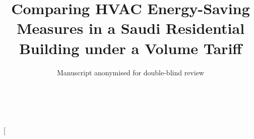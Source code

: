 \documentclass[10pt,a4paper,twocolumn]{article}
\title{\bfseries Comparing HVAC Energy-Saving Measures in a Saudi Residential Building under a Volume Tariff}
\author{Manuscript anonymised for double-blind review \\[6pt]
\mbox{}\\ \mbox{}\\[4pt]
\mbox{}}
\date{}
\author{ }
\theoremstyle{definition}
\begin{document}
\nocite{stockmodel2020,passive_saudi2025,retrofit_jeddah2023,braun1990,naderi2022precool,mayes2024precool,sec_tariff,rl2026hvac,ledreau2016flex,reynders2018flex,mousa2016optimal,mousa2017optimal,henzinger_2000,alur2012optimal,wojtczak2013optimal,alur2013safe,nghiem2011green,nghiem2012scalable,drgona2020mpc,kim2022mpcreview,hou2022mpc,dhaliwal2026mpc,zheng2024empc,wang2024mldr,turner2015peak,wang2023precool,braun2003load,morgan2007impact,canet2023flex,arababadi2017precool,ramacuriel2022dlc,oldewurtel2010reducing,matar2017tou,alayed2021thermal,alsanea_insulation2022,alyami2021building,sbc_envelope2021,alhomoud2021review,krarti_peak2022,alaidroos2015envelope,krarti2020ac,almogbel2020inverter,aldubyan_stayhome2022,alshahrani2019smart,hoyt2015setpoint,standard55,ISO7730,tarsheed_setpoint,sbc201_2018,saso2663_2014,saso2663,sbc602_2018,iso13370_2017,iso13790_2008,brown1962natural,ashrae_fund2021,ahri210240,se_tariff2027,crawley2001energyplus,schork2020ipx,huangfu2018highs,goulart2026clarabel,helton2003lhs,marino2008prcc,tian2013review,saltelli2010perfunctory,judkoff2006validation,ashrae140_2023,sec_tou2010}
\twocolumn[
\end{document}
